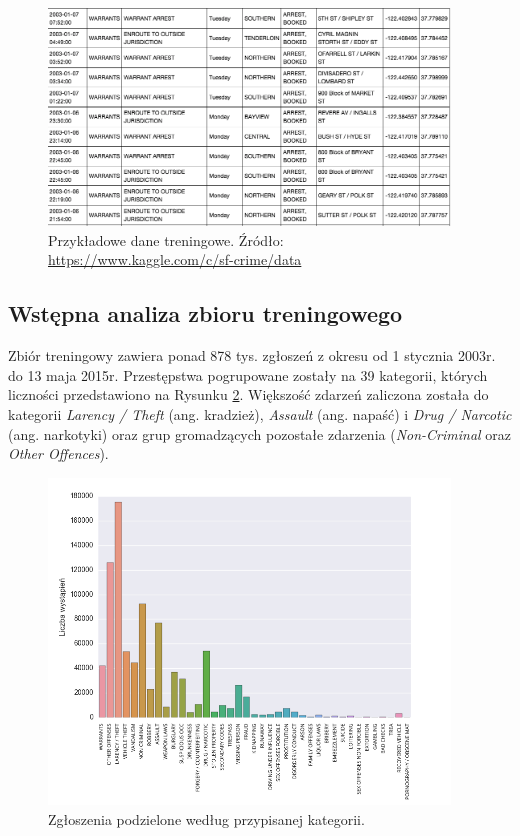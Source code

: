 \documentclass[11pt]{article} %
\begin{document}
\begin{figure}[!h]
  \centering
    \includegraphics[width=0.95\textwidth]{images/train_data.png}
  \caption{Przykładowe dane treningowe. Źródło: \protect\url{https://www.kaggle.com/c/sf-crime/data} } \label{fig:train_data}
\end{figure}



\subsection{Wstępna analiza zbioru treningowego}

Zbiór treningowy zawiera ponad 878 tys. zgłoszeń z okresu od 1 stycznia 2003r. do 13 maja 2015r. Przestępstwa pogrupowane zostały na 39 kategorii, których liczności przedstawiono na Rysunku \ref{fig:categories}. Większość zdarzeń zaliczona została do kategorii \textit{Larency / Theft} (ang. kradzież), \textit{Assault} (ang. napaść) i \textit{Drug / Narcotic} (ang. narkotyki) oraz grup gromadzących pozostałe zdarzenia (\textit{Non-Criminal} oraz \textit{Other Offences}).  \\

\begin{figure}[!h]
  \centering
    \includegraphics[width=0.95\textwidth]{images/categories}
  \caption{Zgłoszenia podzielone według przypisanej kategorii.} \label{fig:categories}
\end{figure}
\end{document}
